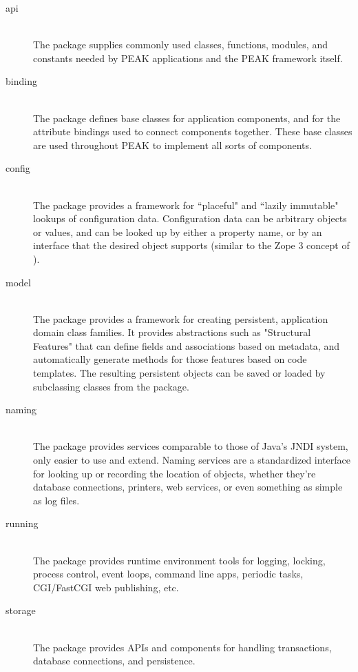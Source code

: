 \begin{description}

\item[api] \hfill \\
The  package supplies commonly used classes, functions,
modules, and constants needed by PEAK applications and the PEAK framework
itself.

\item[binding] \hfill \\
The  package defines base classes for application
components, and for the attribute bindings used to connect components
together.  These base classes are used throughout PEAK to implement all
sorts of components.

\item[config] \hfill \\
The  package provides a framework for ``placeful" and
``lazily immutable" lookups of configuration data.  Configuration data can be
arbitrary objects or values, and can be looked up by either a property name,
or by an interface that the desired object supports (similar to the Zope 3
concept of ).

\item[model] \hfill \\
The  package provides a framework for creating persistent,
application domain class families.  It provides abstractions such as
"Structural Features" that can define fields and associations based on
metadata, and automatically generate methods for those features based on code
templates.  The resulting persistent objects can be saved or loaded by
subclassing  classes from the  package.

\item[naming] \hfill \\
The  package provides services comparable to those of
Java's JNDI system, only easier to use and extend.  Naming services are
a standardized interface for looking up or recording the location of objects,
whether they're database connections, printers, web services, or even
something as simple as log files.

\item[running] \hfill \\
The  package provides runtime environment tools for
logging, locking, process control, event loops, command line apps, periodic
tasks, CGI/FastCGI web publishing, etc.

\item[storage] \hfill \\
The  package provides APIs and components for handling
transactions, database connections, and persistence.

\end{description}

